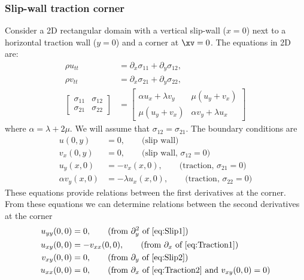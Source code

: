 \documentclass[11pt]{article}
\begin{document}
\newcommand{\dx}{{\Delta x}}
\newcommand{\dy}{{\Delta y}}
\subsubsection{Slip-wall traction corner} \label{sec:slipWallTractionCorner}

Consider a 2D rectangular domain with a vertical slip-wall ($x=0$) next to a horizontal traction wall ($y=0$) and 
a corner at $\xv=0$.
The equations in 2D are: 
\begin{align}
  \rho u_{tt} &= \partial_x \sigma_{11} + \partial_y \sigma_{12},  \label{eq:uEqn} \\
  \rho v_{tt} &= \partial_x \sigma_{21} + \partial_y \sigma_{22},  \label{eq:vEqn} \\
     \begin{bmatrix} 
        \sigma_{11} & \sigma_{12}  \\
        \sigma_{21} & \sigma_{22} 
     \end{bmatrix} 
&= 
     \begin{bmatrix} 
        \alpha u_x +\lambda v_y          & \mu(u_y+v_x)  \\
        \mu(u_y+v_x) &   \alpha v_y +\lambda u_x 
     \end{bmatrix} 
\end{align}
where $\alpha=\lambda+2\mu$. We will assume that $\sigma_{12}=\sigma_{21}$. 
 The boundary conditions are 
\begin{align}
   u(0,y) &= 0,                 \qquad \text{(slip wall)} \label{eq:Slip1} \\ 
   v_x(0,y) &=0,                \qquad \text{(slip wall, $\sigma_{12}=0$)} \label{eq:Slip2} \\
   u_y(x,0) &= -v_x(x,0) ,      \qquad \text{(traction, $\sigma_{21}=0$)}  \label{eq:Traction1}  \\
  \alpha v_y(x,0) &= -\lambda u_x(x,0),  \qquad \text{(traction, $\sigma_{22}=0$)}   \label{eq:Traction2}  
\end{align}
These equations provide relations between the first derivatives at the corner. 
% 
From these equations we can determine relations between the second derivatives at the corner
\begin{align}
   u_{yy}(0,0) &= 0 , \qquad \text{(from $\partial_y^2$ of \eqref{eq:Slip1})} \\
   u_{xy}(0,0) &= -v_{xx}(0,0) , \qquad \text{(from $\partial_x$ of \eqref{eq:Traction1})}  \label{eq:SlipTractionXY} \\ 
   v_{xy}(0,0) &=0,            \qquad \text{(from $\partial_y$ of \eqref{eq:Slip2})}  \\
   u_{xx}(0,0) &=0,    \qquad \text{(from $\partial_x$ of \eqref{eq:Traction2} and $v_{xy}(0,0)=0$)}
\end{align}
\end{document}
